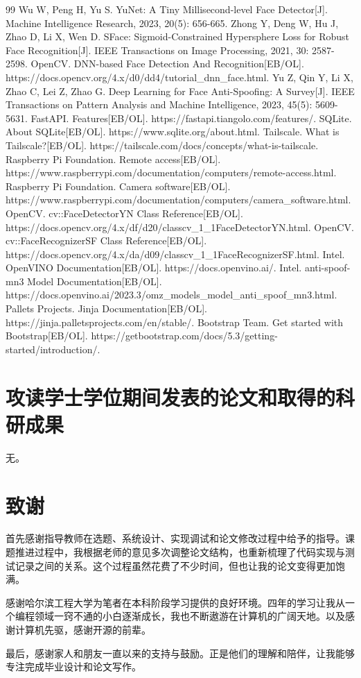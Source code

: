 \documentclass[UTF8]{heuthesis}
\begin{document}
\begin{thebibliography}{99}
 Wu W, Peng H, Yu S. YuNet: A Tiny Millisecond-level Face Detector[J]. Machine Intelligence Research, 2023, 20(5): 656-665.
 Zhong Y, Deng W, Hu J, Zhao D, Li X, Wen D. SFace: Sigmoid-Constrained Hypersphere Loss for Robust Face Recognition[J]. IEEE Transactions on Image Processing, 2021, 30: 2587-2598.
 OpenCV. DNN-based Face Detection And Recognition[EB/OL]. https://docs.opencv.org/4.x/d0/dd4/tutorial\_dnn\_face.html.
 Yu Z, Qin Y, Li X, Zhao C, Lei Z, Zhao G. Deep Learning for Face Anti-Spoofing: A Survey[J]. IEEE Transactions on Pattern Analysis and Machine Intelligence, 2023, 45(5): 5609-5631.
 FastAPI. Features[EB/OL]. https://fastapi.tiangolo.com/features/.
 SQLite. About SQLite[EB/OL]. https://www.sqlite.org/about.html.
 Tailscale. What is Tailscale?[EB/OL]. https://tailscale.com/docs/concepts/what-is-tailscale.
 Raspberry Pi Foundation. Remote access[EB/OL]. https://www.raspberrypi.com/documentation/computers/remote-access.html.
 Raspberry Pi Foundation. Camera software[EB/OL]. https://www.raspberrypi.com/documentation/computers/camera\_software.html.
 OpenCV. cv::FaceDetectorYN Class Reference[EB/OL]. https://docs.opencv.org/4.x/df/d20/classcv\_1\_1FaceDetectorYN.html.
 OpenCV. cv::FaceRecognizerSF Class Reference[EB/OL]. https://docs.opencv.org/4.x/da/d09/classcv\_1\_1FaceRecognizerSF.html.
 Intel. OpenVINO Documentation[EB/OL]. https://docs.openvino.ai/.
 Intel. anti-spoof-mn3 Model Documentation[EB/OL]. https://docs.openvino.ai/2023.3/omz\_models\_model\_anti\_spoof\_mn3.html.
 Pallets Projects. Jinja Documentation[EB/OL]. https://jinja.palletsprojects.com/en/stable/.
 Bootstrap Team. Get started with Bootstrap[EB/OL]. https://getbootstrap.com/docs/5.3/getting-started/introduction/.
\end{thebibliography}
\chapter*{攻读学士学位期间发表的论文和取得的科研成果}
无。

\chapter*{致谢}

首先感谢指导教师在选题、系统设计、实现调试和论文修改过程中给予的指导。课题推进过程中，我根据老师的意见多次调整论文结构，也重新梳理了代码实现与测试记录之间的关系。这个过程虽然花费了不少时间，但也让我的论文变得更加饱满。

感谢哈尔滨工程大学为笔者在本科阶段学习提供的良好环境。四年的学习让我从一个编程领域一窍不通的小白逐渐成长，我也不断遨游在计算机的广阔天地。以及感谢计算机先驱，感谢开源的前辈。

最后，感谢家人和朋友一直以来的支持与鼓励。正是他们的理解和陪伴，让我能够专注完成毕业设计和论文写作。
\end{document}
